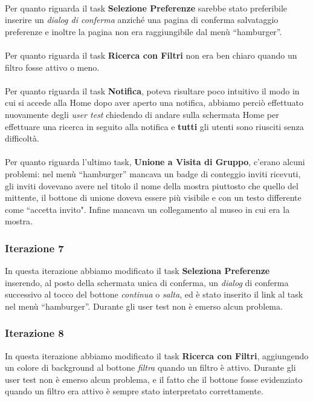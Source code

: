 \paragraph{}
Per quanto riguarda il task \textbf{Selezione Preferenze} sarebbe stato preferibile inserire un \textit{dialog di conferma} anziché una pagina di conferma salvataggio preferenze e inoltre la pagina non era raggiungibile dal menù ``hamburger''. 

\paragraph{}
Per quanto riguarda il task \textbf{Ricerca con Filtri} non era ben chiaro quando un filtro fosse attivo o meno. 

\paragraph{}
Per quanto riguarda il task \textbf{Notifica}, poteva risultare poco intuitivo il modo in cui si accede alla Home dopo aver aperto una notifica, abbiamo perciò effettuato nuovamente degli \textit{user test} chiedendo di andare sulla schermata Home per effettuare una ricerca in seguito alla notifica e \textbf{tutti} gli utenti sono riusciti senza difficoltà.

\paragraph{}
Per quanto riguarda l'ultimo task, \textbf{Unione a Visita di Gruppo}, c'erano alcuni problemi: nel menù ``hamburger'' mancava un badge di conteggio inviti ricevuti, gli inviti dovevano avere nel titolo il nome della mostra piuttosto che quello del mittente, il bottone di unione doveva essere più visibile e con un testo differente come ``accetta invito". Infine mancava un collegamento al museo in cui era la mostra.

\subsubsection{Iterazione 7}
In questa iterazione abbiamo modificato il task \textbf{Seleziona Preferenze} inserendo, al posto della schermata unica di conferma, un \textit{dialog} di conferma successivo al tocco del bottone \textit{continua} o \textit{salta}, ed è stato inserito il link al task nel menù ``hamburger''. Durante gli user test non è emerso alcun problema.

\subsubsection{Iterazione 8}
In questa iterazione abbiamo modificato il task \textbf{Ricerca con Filtri}, aggiungendo un colore di background al bottone \textit{filtra} quando un filtro è attivo. Durante gli user test non è emerso alcun problema, e il fatto che il bottone fosse evidenziato quando un filtro era attivo è sempre stato interpretato correttamente.

